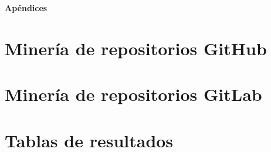 \documentclass[12pt,twoside,titlepage]{report}
\newcommand\blankpage{%
    \newpage
    \null
    \thispagestyle{empty}%
    \newpage}
\begin{document}


\blankpage



{}

\footnotesize{
%


}



\raggedbottom
\afterpage{\blankpage}

\newpage





\appendix

{}

\mbox{}
\vfill
\begin{center}
\begin{Huge}
\textbf{Apéndices}
\end{Huge}
\end{center}
\vfill
\mbox{}
\thispagestyle{empty}

\newpage
\mbox{}
\thispagestyle{empty}
\newpage


\chapter{Minería de repositorios GitHub}
\label{sec:apendice}



\chapter{Minería de repositorios GitLab}
\label{sec:apendice}



\chapter{Tablas de resultados}
\label{sec:apendice}



\end{document}
